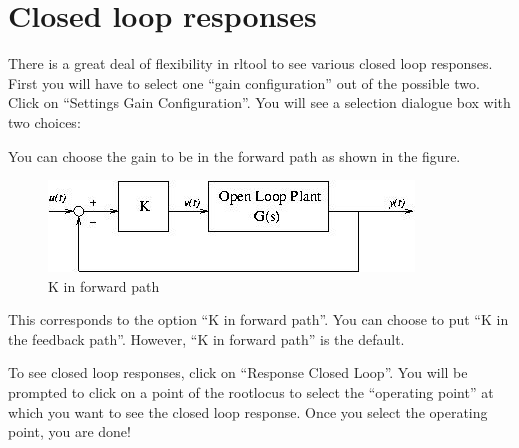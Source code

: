 \section{Closed loop responses}
\label{closedloop}
There is a great deal of flexibility in rltool to see various closed
loop responses. First you will have to select one ``gain configuration'' out of
the possible two. Click on ``Settings \rar Gain Configuration''. You will
see a selection dialogue box with two choices:

You can choose the gain to be in the forward path as shown in the figure.
\begin{figure}
\centerline{\includegraphics[width=3 in]{closedloop}}
\caption{K in forward path}
\end{figure}

This corresponds to the option ``K in forward path''. You can choose
to put ``K in the feedback path''. However, ``K in forward path'' is
the default. 

To see closed loop responses, click on ``Response \rar Closed Loop''. You
will be prompted to click on a point of the rootlocus to select the
``operating point'' at which you want to see the closed loop
response. Once you select the operating point, you are done! 

